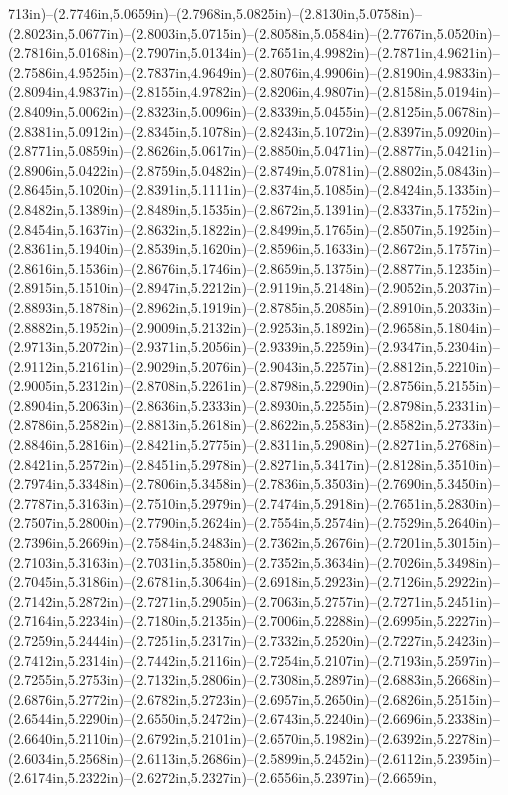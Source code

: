 713in)--(2.7746in,5.0659in)--(2.7968in,5.0825in)--(2.8130in,5.0758in)--(2.8023in,5.0677in)--(2.8003in,5.0715in)--(2.8058in,5.0584in)--(2.7767in,5.0520in)--(2.7816in,5.0168in)--(2.7907in,5.0134in)--(2.7651in,4.9982in)--(2.7871in,4.9621in)--(2.7586in,4.9525in)--(2.7837in,4.9649in)--(2.8076in,4.9906in)--(2.8190in,4.9833in)--(2.8094in,4.9837in)--(2.8155in,4.9782in)--(2.8206in,4.9807in)--(2.8158in,5.0194in)--(2.8409in,5.0062in)--(2.8323in,5.0096in)--(2.8339in,5.0455in)--(2.8125in,5.0678in)--(2.8381in,5.0912in)--(2.8345in,5.1078in)--(2.8243in,5.1072in)--(2.8397in,5.0920in)--(2.8771in,5.0859in)--(2.8626in,5.0617in)--(2.8850in,5.0471in)--(2.8877in,5.0421in)--(2.8906in,5.0422in)--(2.8759in,5.0482in)--(2.8749in,5.0781in)--(2.8802in,5.0843in)--(2.8645in,5.1020in)--(2.8391in,5.1111in)--(2.8374in,5.1085in)--(2.8424in,5.1335in)--(2.8482in,5.1389in)--(2.8489in,5.1535in)--(2.8672in,5.1391in)--(2.8337in,5.1752in)--(2.8454in,5.1637in)--(2.8632in,5.1822in)--(2.8499in,5.1765in)--(2.8507in,5.1925in)--(2.8361in,5.1940in)--(2.8539in,5.1620in)--(2.8596in,5.1633in)--(2.8672in,5.1757in)--(2.8616in,5.1536in)--(2.8676in,5.1746in)--(2.8659in,5.1375in)--(2.8877in,5.1235in)--(2.8915in,5.1510in)--(2.8947in,5.2212in)--(2.9119in,5.2148in)--(2.9052in,5.2037in)--(2.8893in,5.1878in)--(2.8962in,5.1919in)--(2.8785in,5.2085in)--(2.8910in,5.2033in)--(2.8882in,5.1952in)--(2.9009in,5.2132in)--(2.9253in,5.1892in)--(2.9658in,5.1804in)--(2.9713in,5.2072in)--(2.9371in,5.2056in)--(2.9339in,5.2259in)--(2.9347in,5.2304in)--(2.9112in,5.2161in)--(2.9029in,5.2076in)--(2.9043in,5.2257in)--(2.8812in,5.2210in)--(2.9005in,5.2312in)--(2.8708in,5.2261in)--(2.8798in,5.2290in)--(2.8756in,5.2155in)--(2.8904in,5.2063in)--(2.8636in,5.2333in)--(2.8930in,5.2255in)--(2.8798in,5.2331in)--(2.8786in,5.2582in)--(2.8813in,5.2618in)--(2.8622in,5.2583in)--(2.8582in,5.2733in)--(2.8846in,5.2816in)--(2.8421in,5.2775in)--(2.8311in,5.2908in)--(2.8271in,5.2768in)--(2.8421in,5.2572in)--(2.8451in,5.2978in)--(2.8271in,5.3417in)--(2.8128in,5.3510in)--(2.7974in,5.3348in)--(2.7806in,5.3458in)--(2.7836in,5.3503in)--(2.7690in,5.3450in)--(2.7787in,5.3163in)--(2.7510in,5.2979in)--(2.7474in,5.2918in)--(2.7651in,5.2830in)--(2.7507in,5.2800in)--(2.7790in,5.2624in)--(2.7554in,5.2574in)--(2.7529in,5.2640in)--(2.7396in,5.2669in)--(2.7584in,5.2483in)--(2.7362in,5.2676in)--(2.7201in,5.3015in)--(2.7103in,5.3163in)--(2.7031in,5.3580in)--(2.7352in,5.3634in)--(2.7026in,5.3498in)--(2.7045in,5.3186in)--(2.6781in,5.3064in)--(2.6918in,5.2923in)--(2.7126in,5.2922in)--(2.7142in,5.2872in)--(2.7271in,5.2905in)--(2.7063in,5.2757in)--(2.7271in,5.2451in)--(2.7164in,5.2234in)--(2.7180in,5.2135in)--(2.7006in,5.2288in)--(2.6995in,5.2227in)--(2.7259in,5.2444in)--(2.7251in,5.2317in)--(2.7332in,5.2520in)--(2.7227in,5.2423in)--(2.7412in,5.2314in)--(2.7442in,5.2116in)--(2.7254in,5.2107in)--(2.7193in,5.2597in)--(2.7255in,5.2753in)--(2.7132in,5.2806in)--(2.7308in,5.2897in)--(2.6883in,5.2668in)--(2.6876in,5.2772in)--(2.6782in,5.2723in)--(2.6957in,5.2650in)--(2.6826in,5.2515in)--(2.6544in,5.2290in)--(2.6550in,5.2472in)--(2.6743in,5.2240in)--(2.6696in,5.2338in)--(2.6640in,5.2110in)--(2.6792in,5.2101in)--(2.6570in,5.1982in)--(2.6392in,5.2278in)--(2.6034in,5.2568in)--(2.6113in,5.2686in)--(2.5899in,5.2452in)--(2.6112in,5.2395in)--(2.6174in,5.2322in)--(2.6272in,5.2327in)--(2.6556in,5.2397in)--(2.6659in,